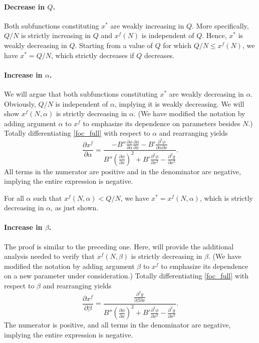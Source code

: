 \documentclass[12pt]{article}
\newcommand{\efficacy}{\phi}
\newcommand{\general}{g}
\newcommand{\benefit}{B}
\newcommand{\xfull}{x^{f\!}}
\begin{document}
\paragraph{Decrease in $Q$.} 

Both subfunctions constituting $x^*$ are weakly increasing in $Q$. More specifically, $Q/N$ is strictly increasing in $Q$ and $\xfull(N)$ is independent of $Q$. Hence, $x^*$ is weakly decreasing in $Q$. Starting from a value of $Q$ for which $Q / N \leq \xfull(N)$, we have $x^* = Q/N$, which strictly decreases if $Q$ decreases. 

\paragraph{Increase in $\alpha$.} 

We will argue that both subfunctions constituting $x^*$ are weakly decreasing in $\alpha$. Obviously, $Q/N$ is independent of $\alpha$, implying it is weakly decreasing. We will show $\xfull(N, \alpha)$ is strictly decreasing in $\alpha$. (We have modified the notation by adding argument $\alpha$ to $\xfull$ to emphasize its dependence on parameters besides $N$.) Totally differentiating  
\eqref{foc_full} with respect to $\alpha$ and rearranging yields
\begin{equation}
\label{a:csN2}
\frac{\partial \xfull}{\partial \alpha} = \frac{-\benefit'' \frac{\partial \efficacy}{\partial \alpha} \frac{\partial \efficacy}{\partial x} - \benefit' \frac{\partial^2 \efficacy}{\partial \alpha \partial x}}{\benefit'' \left( \frac{\partial \efficacy}{\partial x} \right)^2 + \benefit' \frac{\partial^2 \efficacy}{\partial x^2} - \frac{\partial^2 \general}{\partial x^2}}.
\end{equation}
All terms in the numerator are positive and in the denominator are negative, implying the entire expression is negative. 

For all $\alpha$ such that $\xfull(N, \alpha) < Q/N$, we have $x^* = \xfull(N, \alpha)$, which is strictly decreasing in $\alpha$, as just shown.

\paragraph{Increase in $\beta$.} The proof is similar to the preceding one. Here, will provide the additional analysis needed to verify that $\xfull(N, \beta)$ is strictly decreasing in $\beta$.  (We have modified the notation by adding argument $\beta$ to $\xfull$ to emphasize its dependence on a new parameter under consideration.) Totally differentiating  
\eqref{foc_full} with respect to $\beta$ and rearranging yields
\begin{equation}
\label{a:csN3}
\frac{\partial \xfull}{\partial \beta} = \frac{\frac{\partial^2 \general}{\partial \beta \partial x}}{\benefit'' \left( \frac{\partial \efficacy}{\partial x} \right)^2 + \benefit' \frac{\partial^2 \efficacy}{\partial x^2} -  \frac{\partial^2 \general}{\partial x^2}}.
\end{equation}
The numerator is positive, and all terms in the denominator are negative, implying the entire expression is negative. 
\end{document}
